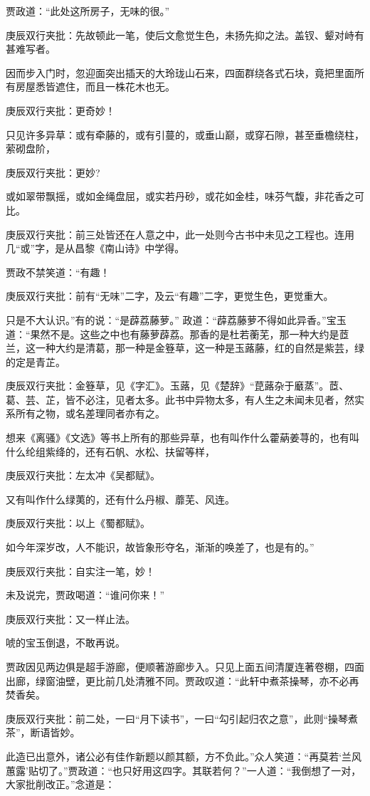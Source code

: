 \begin{parag}
    贾政道：“此处这所房子，无味的很。”\begin{note}庚辰双行夹批：先故顿此一笔，使后文愈觉生色，未扬先抑之法。盖钗、颦对峙有甚难写者。\end{note}因而步入门时，忽迎面突出插天的大玲珑山石来，四面群绕各式石块，竟把里面所有房屋悉皆遮住，而且一株花木也无。\begin{note}庚辰双行夹批：更奇妙！\end{note}只见许多异草：或有牵藤的，或有引蔓的，或垂山巅，或穿石隙，甚至垂檐绕柱，萦砌盘阶，\begin{note}庚辰双行夹批：更妙?\end{note}或如翠带飘摇，或如金绳盘屈，或实若丹砂，或花如金桂，味芬气馥，非花香之可比。\begin{note}庚辰双行夹批：前三处皆还在人意之中，此一处则今古书中未见之工程也。连用几“或”字，是从昌黎《南山诗》中学得。\end{note}贾政不禁笑道：“有趣！\begin{note}庚辰双行夹批：前有“无味”二字，及云“有趣”二字，更觉生色，更觉重大。\end{note}只是不大认识。”有的说：“是薜荔藤萝。” 政道：“薜荔藤萝不得如此异香。”宝玉道：“果然不是。这些之中也有藤萝薜荔。那香的是杜若蘅芜，那一种大约是茝兰，这一种大约是清葛，那一种是金簦草，这一种是玉蕗藤，红的自然是紫芸，绿的定是青芷。\begin{note}庚辰双行夹批：金簦草，见《字汇》。玉蕗，见《楚辞》“菎蕗杂于黀蒸”。茝、葛、芸、芷，皆不必注，见者太多。此书中异物太多，有人生之未闻未见者，然实系所有之物，或名差理同者亦有之。\end{note}想来《离骚》《文选》等书上所有的那些异草，也有叫作什么藿蒳姜荨的，也有叫什么纶组紫绛的，还有石帆、水松、扶留等样，\begin{note}庚辰双行夹批：左太冲《吴都赋》。\end{note}又有叫作什么绿荑的，还有什么丹椒、蘼芜、风连。\begin{note}庚辰双行夹批：以上《蜀都赋》。\end{note}如今年深岁改，人不能识，故皆象形夺名，渐渐的唤差了，也是有的。”\begin{note}庚辰双行夹批：自实注一笔，妙！\end{note}未及说完，贾政喝道：“谁问你来！”\begin{note}庚辰双行夹批：又一样止法。\end{note}唬的宝玉倒退，不敢再说。
\end{parag}


\begin{parag}
    贾政因见两边俱是超手游廊，便顺著游廊步入。只见上面五间清厦连著卷棚，四面出廊，绿窗油壁，更比前几处清雅不同。贾政叹道：“此轩中煮茶操琴，亦不必再焚香矣。\begin{note}庚辰双行夹批：前二处，一曰“月下读书”，一曰“勾引起归农之意”，此则“操琴煮茶”，断语皆妙。\end{note}此造已出意外，诸公必有佳作新题以颜其额，方不负此。”众人笑道：“再莫若‘兰风蕙露’贴切了。”贾政道：“也只好用这四字。其联若何？”一人道：“我倒想了一对，大家批削改正。”念道是：
\end{parag}


